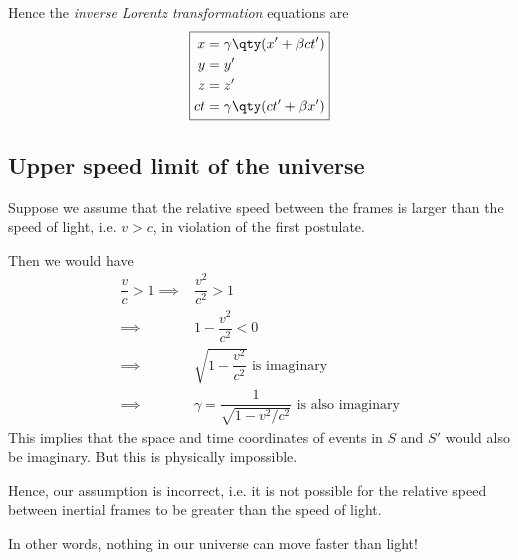 	Hence the \emph{inverse Lorentz transformation} equations are
	\begin{equation} \label{eqn:lorentz-transformations:inverse}
		\boxed{
			\begin{aligned}
				x&=\gamma\qty(x'+\beta ct') \\
				y&=y' \\
				z&=z' \\
				ct&=\gamma\qty(ct'+\beta x')
			\end{aligned}
		}
	\end{equation}
	
	\subsection{Upper speed limit of the universe}
		Suppose we assume that the relative speed between the frames is larger than the speed of light, i.e. $v>c$, in violation of the first postulate.
		
		Then we would have
		\begin{align*}
			\dfrac{v}{c}>1\implies&\dfrac{v^2}{c^2}>1 \\
			\implies&1-\dfrac{v^2}{c^2}<0 \\
			\implies&\sqrt{1-\dfrac{v^2}{c^2}}\text{ is imaginary} \\
			\implies&\gamma=\dfrac{1}{\sqrt{1-v^2/c^2}}\text{ is also imaginary}
		\end{align*}
		This implies that the space and time coordinates of events in $S$ and $S'$ would also be imaginary. But this is physically impossible.
		
		Hence, our assumption is incorrect, i.e. it is not possible for the relative speed between inertial frames to be greater than the speed of light.
		
		In other words, nothing in our universe can move faster than light!
	
	
